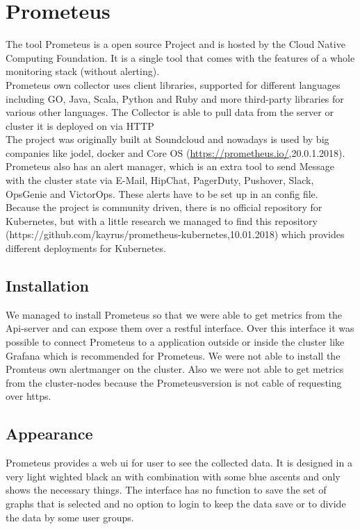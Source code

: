 \section{Prometeus}
\label{Prometeus} %
The tool Prometeus is a open source Project and is hosted by the Cloud Native Computing Foundation.
It is a single tool that comes with the features of a whole monitoring stack (without alerting).\\ Prometeus own collector uses client libraries, supported for different languages including GO, Java, Scala, Python and Ruby and more third-party libraries for various other languages. The Collector is able to pull data from the server or cluster it is deployed on via HTTP\\
 The project was originally built at Soundcloud and nowadays is used by big companies like jodel, docker and Core OS (\url{https://prometheus.io/},20.0.1.2018). \\
 Prometeus also has an alert manager, which is an extra tool to send Message with the cluster state via E-Mail, HipChat, PagerDuty, Pushover, Slack, OpsGenie and VictorOps. These alerts have to be set up in an config file. \\
  Because the project is community driven, there is no official repository for Kubernetes, but with a little research we managed to find this repository (https://github.com/kayrus/prometheus-kubernetes,10.01.2018) which provides different deployments for Kubernetes.
\subsection{Installation}
We managed to install Prometeus so that we were able to get metrics from the Api-server and can expose them over a restful interface. Over this interface it was possible to connect Prometeus to a application outside or inside the cluster like Grafana which is recommended for Prometeus. We were not able to install the Promteus own alertmanger on the cluster. Also we were not able to get metrics from the cluster-nodes because the Prometeusversion is not cable of requesting over https. 
\subsection{Appearance}%
Prometeus provides a web ui for user to see the collected data. It is designed in a very light wighted black an with combination with some blue ascents and only shows the necessary things. The interface has no function to save the set of graphs that is selected and no option to login to keep the data save or to divide the data by some user groups.   
